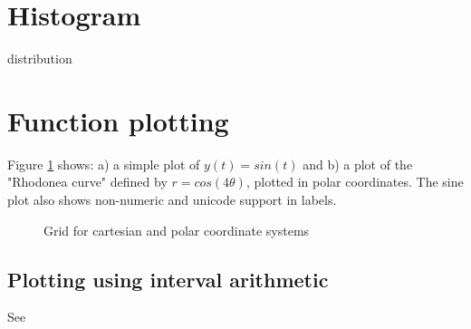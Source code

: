 \section{Histogram}
distribution

\section{Function plotting}

Figure \ref{plots} shows: a) a simple plot of $y(t) = sin(t)$ and b) a plot of the "Rhodonea curve" defined by $r = cos(4\theta)$, plotted in polar coordinates. The sine plot also shows non-numeric and unicode support in labels.

\begin{figure}[H]
	\centering
	\caption{Grid for cartesian and polar coordinate systems}
	\label{plots}
\end{figure}

\subsection{Plotting using interval arithmetic}
See \cite{shou05, fateman92, martin02}
